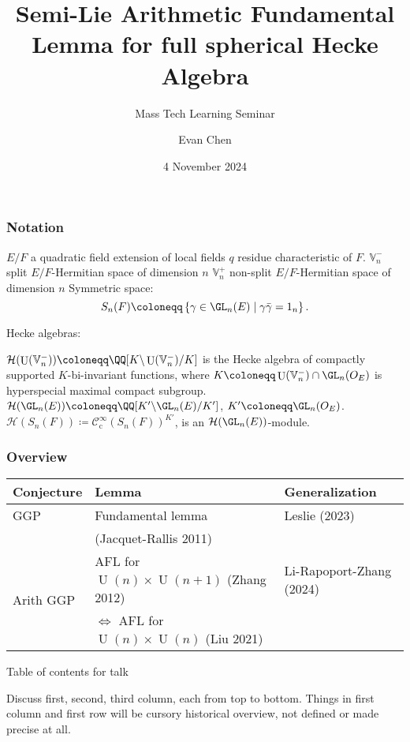 \documentclass[11pt]{beamer}
\title[Semi-Lie AFL for full Hecke algebra]{Semi-Lie Arithmetic Fundamental Lemma for full spherical Hecke Algebra}
\subtitle{Mass Tech Learning Seminar}
\author{Evan Chen}
\date{4 November 2024}
\DeclareMathOperator{\U}{U}
\newcommand{\HH}{\mathcal{H}}
\newcommand{\VV}{\mathbb{V}}
\renewcommand{\OO}{O}
\begin{document}
\begin{frame}
  \maketitle
\end{frame}

\begin{frame}
  \frametitle{Notation}
  \begin{itemize}
  \ii $E/F$ a quadratic field extension of local fields
  \ii $q$ residue characteristic of $F$.
  \ii $\VV_n^-$ split $E/F$-Hermitian space of dimension $n$
  \ii $\VV_n^+$ non-split $E/F$-Hermitian space of dimension $n$
  \ii Symmetric space:
  \[ S_n(F) \coloneqq \left\{ \gamma \in \GL_n(E) \mid \gamma\bar\gamma = 1_n \right\} . \]
  \end{itemize}
  Hecke algebras:
  \begin{itemize}
  \ii $\HH(\U(\VV_n^-)) \coloneqq \QQ[K \backslash \U(\VV_n^-) \slash K]$
  is the Hecke algebra of compactly supported $K$-bi-invariant functions,
  where $K \coloneqq \U(\VV_n^-) \cap \GL_n(\OO_E)$ is hyperspecial maximal compact subgroup.
  \ii $\HH(\GL_n(E)) \coloneqq \QQ[K' \backslash \GL_n(E) \slash K']$, $K' \coloneqq \GL_n(\OO_E)$.
  \ii $\HH(S_n(F)) \coloneqq \mathcal C^\infty_{\text{c}} (S_n(F))^{K'}$,
  is an $\HH(\GL_n(E))$-module.
  \end{itemize}
\end{frame}


\begin{frame}
  \frametitle{Overview}
  \centering
  \begin{tabular}{lp{12em}p{8em}}
    \toprule
    \textbf{Conjecture} & \textbf{Lemma} & \textbf{Generalization} \\
    \midrule
    GGP & Fundamental lemma & Leslie (2023) \\ & (Jacquet-Rallis 2011) \\
    \midrule
    \multirow{2}{*}[-1em]{Arith GGP} & AFL for $\U(n) \times \U(n+1)$ (Zhang 2012) & Li-Rapoport-Zhang (2024) \\ \cline{2-3}
    & $\iff$ AFL for $\U(n) \times \U(n)$ (Liu 2021) & 🤔 \\
    \bottomrule
  \end{tabular}
  \begin{block}{Table of contents for talk}
    \begin{itemize}
    \ii Discuss first, second, third column, each from top to bottom.
    \ii Things in first column and first row will be cursory historical overview,
      not defined or made precise at all.
    \end{itemize}
  \end{block}
\end{frame}
\end{document}
